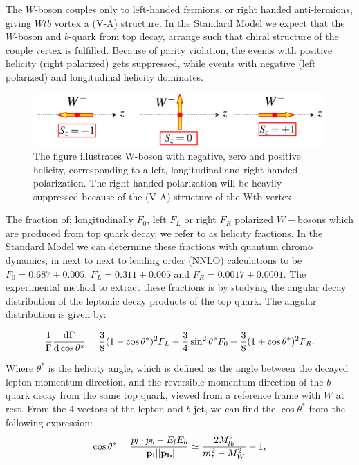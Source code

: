 \documentclass[12pt,a4paper]{article}
\numberwithin{equation}{section}
\begin{document}
The $W$-boson couples only to left-handed fermions, or right handed
anti-fermions, giving $Wtb$ vortex a (V-A) structure. In the Standard Model we
expect that the $W$-boson and $b$-quark from top decay, arrange such that chiral
structure of the couple vertex is fulfilled. Because of parity violation, the
events with positive helicity (right polarized) gets suppressed, while events
with negative (left polarized) and longitudinal helicity dominates.

\begin{figure}[H]
	\includegraphics[width=\linewidth]{figures/w_polarization.png}
	\caption{The figure illustrates W-boson with negative, zero and positive
    helicity, corresponding to a left, longitudinal and right handed
    polarization. The right handed polarization will be heavily suppressed
    because of the (V-A) structure of the Wtb vertex.}\label{fig:polarization}
\end{figure}

The fraction of; longitudinally $F_0$, left $F_L$ or right $F_R$ polarized
$W-$bosons which are produced from top quark decay, we refer to as helicity
fractions. In the Standard Model we can determine these fractions with quantum
chromo dynamics, in next to next to leading order (NNLO) calculations to be
$F_0 = 0.687 \pm 0.005$, $F_L = 0.311 \pm 0.005$ and
$F_R = 0.0017 \pm 0.0001$\cite{Czarnecki_2010}. The experimental method to
extract these fractions is by studying the angular decay distribution of the
leptonic decay products of the top quark. The angular distribution is given by:

\begin{equation}
  \frac{1}{\Gamma}\dv{\Gamma}{\cos \theta^*} = \frac{3}{8}(1-\cos \theta^*)^2 F_L +
  \frac{3}{4}\sin^2 \theta^* F_0 + \frac{3}{8}(1+\cos \theta^*)^2 F_R.
\end{equation}

Where $\theta^*$ is the helicity angle, which is defined as the angle between the
decayed lepton momentum direction, and the reversible momentum direction of the
$b$-quark decay from the same top quark, viewed from a reference frame with $W$
at rest\cite{PhysRevD.45.124}. From the 4-vectors of the lepton and $b$-jet, we
can find the $\cos \theta^*$ from the following expression:
\begin{equation}
  \cos \theta^*=\frac{p_l\cdot p_b-E_lE_b}{\abs{\vb{p_l}}\abs{\vb{p_b}}} \simeq \frac{2 M_{lb}^2}{m_t^2 - M_W^2} - 1, \label{eq:costheta}
\end{equation}
\end{document}
